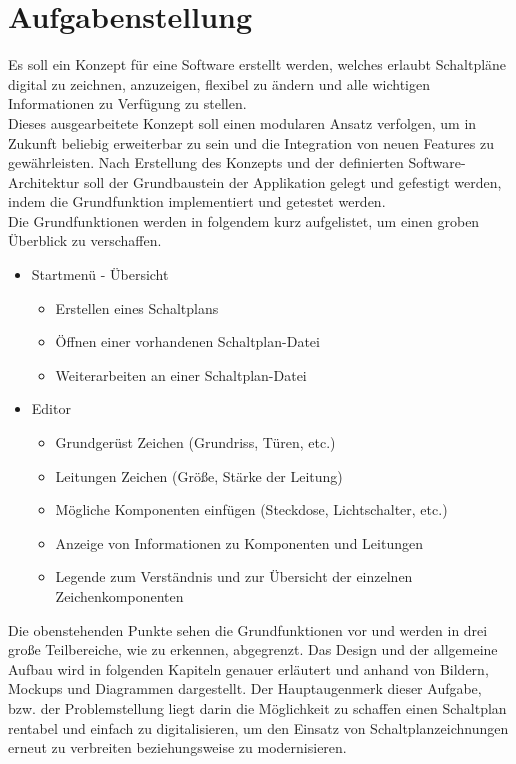 \section{Aufgabenstellung}
Es soll ein Konzept für eine Software erstellt werden, welches erlaubt Schaltpläne digital zu zeichnen, anzuzeigen, 
flexibel zu ändern und alle wichtigen Informationen zu Verfügung zu stellen. 
\\ Dieses ausgearbeitete Konzept soll einen modularen Ansatz verfolgen, um in Zukunft beliebig erweiterbar zu sein
und die Integration von neuen Features zu gewährleisten. Nach Erstellung des Konzepts und der definierten Software-Architektur
soll der Grundbaustein der Applikation gelegt und gefestigt werden, indem die Grundfunktion implementiert und getestet werden.
\\Die Grundfunktionen werden in folgendem kurz aufgelistet, um einen groben Überblick zu verschaffen.
\begin{itemize}
    \item Startmenü - Übersicht
    \begin{itemize}
        \item Erstellen eines Schaltplans
        \item Öffnen einer vorhandenen Schaltplan-Datei
        \item Weiterarbeiten an einer Schaltplan-Datei
    \end{itemize}
    \item Editor
    \begin{itemize}
        \item Grundgerüst Zeichen (Grundriss, Türen, etc.)
        \item Leitungen Zeichen (Größe, Stärke der Leitung)
        \item Mögliche Komponenten einfügen (Steckdose, Lichtschalter, etc.) 
        \item Anzeige von Informationen zu Komponenten und Leitungen
        \item Legende zum Verständnis und zur Übersicht der einzelnen Zeichenkomponenten
    \end{itemize}
    
\end{itemize}
Die obenstehenden Punkte sehen die Grundfunktionen vor und werden in drei große Teilbereiche, wie zu erkennen, abgegrenzt. 
Das Design und der allgemeine Aufbau wird in folgenden Kapiteln genauer erläutert und anhand von Bildern,
Mockups und Diagrammen dargestellt.
\linebreak
\linebreak
Der Hauptaugenmerk dieser Aufgabe, bzw. der Problemstellung liegt darin die Möglichkeit zu schaffen
einen Schaltplan rentabel und einfach zu digitalisieren, um den Einsatz von Schaltplanzeichnungen erneut zu verbreiten beziehungsweise
zu modernisieren. 
\newpage
